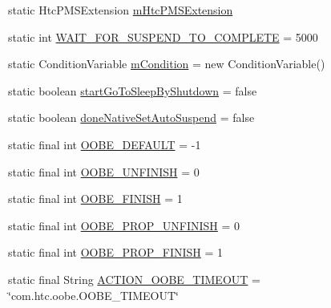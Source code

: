 \begin{DoxyCompactItemize}
\item 
static Htc\-P\-M\-S\-Extension \hyperlink{classcom_1_1android_1_1server_1_1power_1_1PowerManagerService_ab4a35db47d0b489865f480113e83079f}{m\-Htc\-P\-M\-S\-Extension}
\item 
static int \hyperlink{classcom_1_1android_1_1server_1_1power_1_1PowerManagerService_a427c6bb5a36660e6ad45d93dca62575e}{W\-A\-I\-T\-\_\-\-F\-O\-R\-\_\-\-S\-U\-S\-P\-E\-N\-D\-\_\-\-T\-O\-\_\-\-C\-O\-M\-P\-L\-E\-T\-E} = 5000
\item 
static Condition\-Variable \hyperlink{classcom_1_1android_1_1server_1_1power_1_1PowerManagerService_a94f4d1b811aff8658b9039c311459e12}{m\-Condition} = new Condition\-Variable()
\item 
static boolean \hyperlink{classcom_1_1android_1_1server_1_1power_1_1PowerManagerService_a6bc07b09a4f7def2eb3b97c29610b0ed}{start\-Go\-To\-Sleep\-By\-Shutdown} = false
\item 
static boolean \hyperlink{classcom_1_1android_1_1server_1_1power_1_1PowerManagerService_a4088ed8b06aca47231fdd1d4fa39a727}{done\-Native\-Set\-Auto\-Suspend} = false
\item 
static final int \hyperlink{classcom_1_1android_1_1server_1_1power_1_1PowerManagerService_a6fc29a287ca87543c34c395783f96241}{O\-O\-B\-E\-\_\-\-D\-E\-F\-A\-U\-L\-T} = -\/1
\item 
static final int \hyperlink{classcom_1_1android_1_1server_1_1power_1_1PowerManagerService_a23deb29bc3b498540302184da4dbdefa}{O\-O\-B\-E\-\_\-\-U\-N\-F\-I\-N\-I\-S\-H} = 0
\item 
static final int \hyperlink{classcom_1_1android_1_1server_1_1power_1_1PowerManagerService_a490b97ab4ecd268b6d9a502c4212eee6}{O\-O\-B\-E\-\_\-\-F\-I\-N\-I\-S\-H} = 1
\item 
static final int \hyperlink{classcom_1_1android_1_1server_1_1power_1_1PowerManagerService_a687e719cc7c3471a95a6fe1c3633b6fc}{O\-O\-B\-E\-\_\-\-P\-R\-O\-P\-\_\-\-U\-N\-F\-I\-N\-I\-S\-H} = 0
\item 
static final int \hyperlink{classcom_1_1android_1_1server_1_1power_1_1PowerManagerService_aeb9cbd4d6aa87f24ef88f99928c2a152}{O\-O\-B\-E\-\_\-\-P\-R\-O\-P\-\_\-\-F\-I\-N\-I\-S\-H} = 1
\item 
static final String \hyperlink{classcom_1_1android_1_1server_1_1power_1_1PowerManagerService_a43e6b272375d2b6f9b01230e1ba67aab}{A\-C\-T\-I\-O\-N\-\_\-\-O\-O\-B\-E\-\_\-\-T\-I\-M\-E\-O\-U\-T} = \char`\"{}com.\-htc.\-oobe.\-O\-O\-B\-E\-\_\-\-T\-I\-M\-E\-O\-U\-T\char`\"{}
\item 

\end{DoxyCompactItemize}
